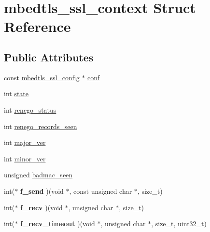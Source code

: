 \hypertarget{structmbedtls__ssl__context}{\section{mbedtls\-\_\-ssl\-\_\-context Struct Reference}
\label{structmbedtls__ssl__context}
}
\subsection*{Public Attributes}
\begin{DoxyCompactItemize}
\item 
const \hyperlink{structmbedtls__ssl__config}{mbedtls\-\_\-ssl\-\_\-config} $\ast$ \hyperlink{structmbedtls__ssl__context_af91df820bd8e776101c580a89bac9bf7}{conf}
\item 
int \hyperlink{structmbedtls__ssl__context_a32cd4a2bcd224f570b5a350e277ccca3}{state}
\item 
int \hyperlink{structmbedtls__ssl__context_a2d0234b74d1f125e14e1b78a61db2edf}{renego\-\_\-status}
\item 
int \hyperlink{structmbedtls__ssl__context_aa735220d7fc72e44974f70f28fc70814}{renego\-\_\-records\-\_\-seen}
\item 
int \hyperlink{structmbedtls__ssl__context_a149cbf2760485998884d10b530e4580a}{major\-\_\-ver}
\item 
int \hyperlink{structmbedtls__ssl__context_ac68723758d3617fee8ac862931f495b2}{minor\-\_\-ver}
\item 
unsigned \hyperlink{structmbedtls__ssl__context_ade2a10fc444a50b44a2caee1312d5b7e}{badmac\-\_\-seen}
\item 
\hypertarget{structmbedtls__ssl__context_afd5294d6922033cd55c5c11272683377}{int($\ast$ {\bfseries f\-\_\-send} )(void $\ast$, const unsigned char $\ast$, size\-\_\-t)}\label{structmbedtls__ssl__context_afd5294d6922033cd55c5c11272683377}

\item 
\hypertarget{structmbedtls__ssl__context_ab57f1b675a026b18c794df99ce0f76a4}{int($\ast$ {\bfseries f\-\_\-recv} )(void $\ast$, unsigned char $\ast$, size\-\_\-t)}\label{structmbedtls__ssl__context_ab57f1b675a026b18c794df99ce0f76a4}

\item 
\hypertarget{structmbedtls__ssl__context_a76b5b2a5acb5dd441fae560bc434f128}{int($\ast$ {\bfseries f\-\_\-recv\-\_\-timeout} )(void $\ast$, unsigned char $\ast$, size\-\_\-t, uint32\-\_\-t)}\label{structmbedtls__ssl__context_a76b5b2a5acb5dd441fae560bc434f128}


\end{DoxyCompactItemize}
